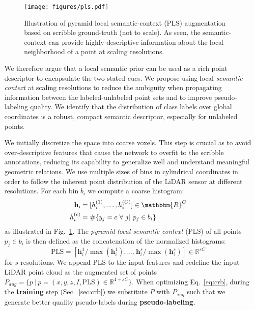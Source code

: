 \documentclass[10pt,twocolumn,letterpaper]{article}
\begin{document}
\begin{figure}[t]
    \centering
    \texttt{[image: figures/pls.pdf]}
    \caption{Illustration of pyramid local semantic-context (PLS) augmentation based on scribble ground-truth (not to scale). As seen, the semantic-context can provide highly descriptive information about the local neighborhood of a point at scaling resolutions.}
    \label{fig:pls}
\end{figure}

We therefore argue that a local semantic prior can be used as a rich point descriptor to encapsulate the two stated cues. We propose using local \textit{semantic-context} at scaling resolutions to reduce the ambiguity when propagating information between the labeled-unlabeled point sets and to improve pseudo-labeling quality. 
We identify that the distribution of class labels over global coordinates is a robust, compact semantic descriptor, especially for unlabeled points.

We initially discretize the space into coarse voxels. This step is crucial as to avoid over-descriptive features that cause the network to overfit to the scribble annotations, reducing its capability to generalize well and understand meaningful geometric relations. We use multiple sizes of bins in cylindrical coordinates in order to follow the inherent point distribution of the LiDAR sensor at different resolutions. For each bin $b_{i}$ we compute a coarse histogram: \vspace{-5px}
\begin{equation}
    \begin{split}
        \mathbf{h}_i &= [h^{(1)}_i, \dots, h^{(C)}_i] \in \mathbbm{R}^C \\
        h^{(c)}_i &= \# \{ y_j = c \ \forall \ j | \ p_j \in b_i \}
    \end{split}
\end{equation}
as illustrated in Fig.~\ref{fig:pls}. The \textit{pyramid local semantic-context} (PLS) of all points $p_j\in b_i$ is then defined as the concatenation of the normalized histograms:
\begin{equation}
    \textrm{PLS} = [\mathbf{h}^1_i/\max(\mathbf{h}^1_i), \dots, \mathbf{h}^s_i/\max(\mathbf{h}^s_i)] \in \mathbb{R}^{sC}
\end{equation}
for $s$ resolutions. We append PLS to the input features and redefine the input LiDAR point cloud as the augmented set of points ${P_{aug}=\{p \ | \ p = (x,y,z,I,\textrm{PLS}) \in \mathbb{R}^{4+sC}\}}$. When optimizing Eq.~\ref{eq:crb}, during the \textbf{training} step (Sec.~\ref{sec:crb}) we substitute $P$ with $P_{aug}$ such that we generate better quality pseudo-labels during \textbf{pseudo-labeling}. 
\end{document}
